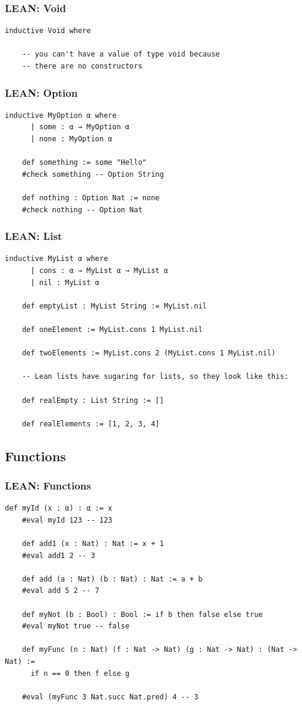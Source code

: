 \documentclass{beamer}
\begin{document}
\begin{frame}[fragile]
  \frametitle{LEAN: Void}

  \begin{lstlisting}[language=lean]
    inductive Void where

    -- you can't have a value of type void because
    -- there are no constructors
  \end{lstlisting}
\end{frame}

\begin{frame}[fragile]
  \frametitle{LEAN: Option}

  \begin{lstlisting}[language=lean]
    inductive MyOption α where
      | some : α → MyOption α
      | none : MyOption α

    def something := some "Hello"
    #check something -- Option String

    def nothing : Option Nat := none
    #check nothing -- Option Nat
  \end{lstlisting}
\end{frame}

\begin{frame}[fragile]
  \frametitle{LEAN: List}

  \begin{lstlisting}[language=lean]
    inductive MyList α where
      | cons : α → MyList α → MyList α
      | nil : MyList α

    def emptyList : MyList String := MyList.nil

    def oneElement := MyList.cons 1 MyList.nil

    def twoElements := MyList.cons 2 (MyList.cons 1 MyList.nil)

    -- Lean lists have sugaring for lists, so they look like this:

    def realEmpty : List String := []

    def realElements := [1, 2, 3, 4]
  \end{lstlisting}
\end{frame}

\subsection{Functions}

\begin{frame}[fragile]
  \frametitle{LEAN: Functions}

  \begin{lstlisting}[language=lean]
    def myId (x : α) : α := x
    #eval myId 123 -- 123

    def add1 (x : Nat) : Nat := x + 1
    #eval add1 2 -- 3

    def add (a : Nat) (b : Nat) : Nat := a + b
    #eval add 5 2 -- 7

    def myNot (b : Bool) : Bool := if b then false else true
    #eval myNot true -- false

    def myFunc (n : Nat) (f : Nat -> Nat) (g : Nat -> Nat) : (Nat -> Nat) :=
      if n == 0 then f else g

    #eval (myFunc 3 Nat.succ Nat.pred) 4 -- 3
  \end{lstlisting}
\end{frame}
\end{document}
